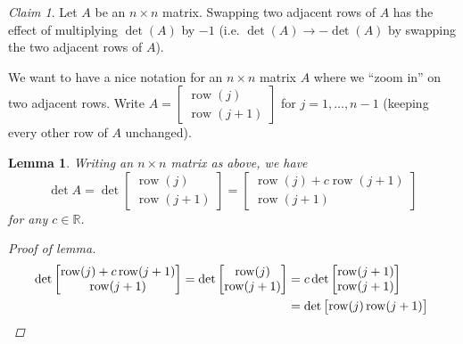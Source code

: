 \documentclass[12pt,letterpaper,DIV=11,final]{scrartcl}
\theoremstyle{plain}
\newtheorem{lemma}[theorem]{Lemma}
\theoremstyle{definition}
\theoremstyle{remark}
\newtheorem{claim}{Claim}
\DeclareMathOperator{\row}{row}
\begin{document}
\begin{claim}
  Let $A$ be an $n \times n$ matrix.
  Swapping two adjacent rows of $A$ has the effect of multiplying $\det(A)$ by $-1$ (i.e. $\det(A) \to -\det(A)$ by swapping the two adjacent rows of $A$).

  We want to have a nice notation for an $n \times n$ matrix $A$ where we \enquote{zoom in} on two adjacent rows.
  Write $A = \begin{bmatrix}
    \row(j) \\
    \row(j + 1)
  \end{bmatrix}$ for $j = 1, \dots, n - 1$ (keeping every other row of $A$ unchanged).

  \begin{lemma}
    Writing an $n \times n$ matrix as above, we have
    \begin{displaymath}
      \det A = \det \begin{bmatrix}
        \row(j) \\
        \row(j + 1)
      \end{bmatrix} =
      \begin{bmatrix}
        \row(j) + c \row(j + 1) \\
        \row(j + 1)
      \end{bmatrix}
    \end{displaymath}
    for any $c \in \mathbb{R}$.

    \begin{proof}[Proof of lemma]
      \begin{align*}
        \det \begin{bmatrix}
          \row(j) + c \row(j + 1) \\
          \row(j + 1)
        \end{bmatrix} = \det%
        \begin{bmatrix}
          \row(j) \\
          \row(j + 1)
        \end{bmatrix} &= c \det%
        \begin{bmatrix}
          \row(j + 1) \\
          \row(j + 1)
        \end{bmatrix} \\
        &= \det%
        \begin{bmatrix}
          \row(j)
          \row(j + 1)
        \end{bmatrix} \qedhere
      \end{align*}
    \end{proof}
  \end{lemma}


\end{claim}
\end{document}
